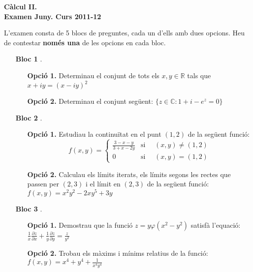 \documentclass[12pt]{report}
\newcommand\R{\mathbb{R}}
\newcommand\C{\mathbb{C}}
\begin{document}
\begin{center}
\textbf{\Large Càlcul II.\\ Examen Juny. Curs 2011-12}
\end{center}

\vskip 0.3cm
\noindent
L'examen consta de 5 blocs de preguntes, cada un d'ells amb dues opcions. Heu de contestar \textbf{només una} de les opcions
en cada bloc.

\vskip 0.5cm
\begin{enumerate}
\item[\textbf{Bloc 1}]. 

\begin{enumerate}
\item[
\textbf{Opció 1.}] Determinau el conjunt de tots els $x, y \in \R$ tals que $x+iy=(x-iy)^2$
\item[
\textbf{Opció 2.}] Determinau el conjunt següent: $\{ z \in \C : 1+i-e^{z}=0 \}$
\end{enumerate}

\vskip 0.3cm

\item[\textbf{Bloc 2}]. 

\begin{enumerate}
\item[
\textbf{Opció 1.}]  Estudiau la continuïtat en el punt $(1, 2)$ de la següent funció:
\[
f(x, y)=\begin{cases} \frac{3-x-y}{3+x-2y}  & \text{si } \quad (x, y) \neq (1, 2) \\ 0 & \text{si } \quad (x, y)=(1, 2) \end{cases}
\]
\item[
\textbf{Opció 2.}] Calculau els límits iterats, els límits segons les rectes que passen per $(2, 3)$ i el límit en $(2, 3)$
de la següent funció:
$
f(x, y)=x^2y^2-2xy^5+3y
$
\end{enumerate}

\vskip 0.3cm

\item[\textbf{Bloc 3}].

\begin{enumerate}
\item[
\textbf{Opció 1.}]  Demostrau que la funció $z=y \varphi(x^2-y^2)$ satisfà l'equació:
$
\displaystyle
\frac{1}{x} \frac{\partial z}{\partial x} + \frac{1}{y} \frac{\partial z}{\partial y}=\frac{z}{y^2}
$
\item[
\textbf{Opció 2.}]  Trobau els màxims i mínims relatius de la funció:
$
\displaystyle
f(x, y)=x^4+y^4+\frac{1}{x^4y^4}
$
\end{enumerate}


\end{enumerate}
\end{document}
